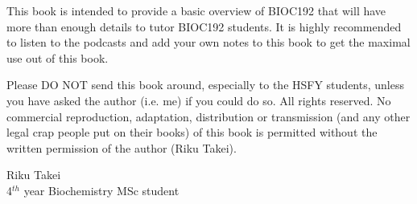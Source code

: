 This book is intended to provide a basic overview of BIOC192 that will have more than enough details to tutor BIOC192 students.
It is highly recommended to listen to the podcasts and add your own notes to this book to get the maximal use out of this book.

Please DO NOT send this book around, especially to the HSFY students, unless you have asked the author (i.e. me) if you could do so.
All rights reserved.
No commercial reproduction, adaptation, distribution or transmission (and any other legal crap people put on their books) of this book is permitted without the written permission of the author (Riku Takei).


\vspace{5cm}

\noindent
Riku Takei \\
4$^{th}$ year Biochemistry MSc student\\
